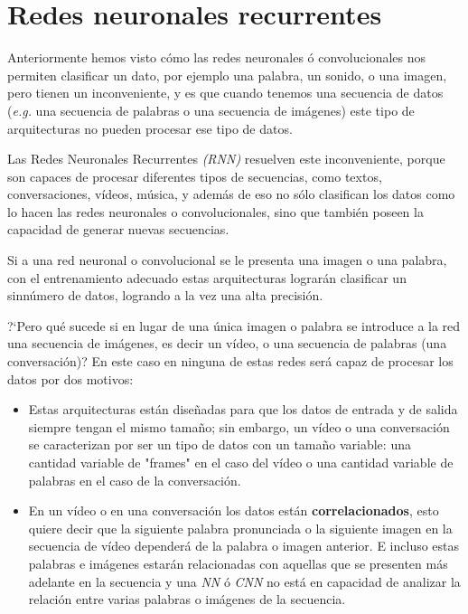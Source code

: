 \documentclass[a4paper,12pt]{article}
\begin{document}
\clearpage

\section{Redes neuronales recurrentes}
Anteriormente hemos visto cómo las redes neuronales ó convolucionales nos permiten clasificar un dato, por ejemplo una palabra, un sonido, o una imagen, pero tienen un inconveniente, y es que cuando tenemos una secuencia de datos (\textit{e.g.} una secuencia de palabras o una secuencia de imágenes) este tipo de arquitecturas no pueden procesar ese tipo de datos. 

Las Redes Neuronales Recurrentes \textit{(RNN)} \citep{karpathy:rnn} resuelven este inconveniente, porque son capaces de procesar diferentes tipos de secuencias, como textos, conversaciones, vídeos, música, y además de eso no sólo clasifican los datos como lo hacen las redes neuronales o convolucionales, sino que también poseen la capacidad de generar nuevas secuencias.

Si a una red neuronal o convolucional se le presenta una imagen o una palabra, con el entrenamiento adecuado estas arquitecturas lograrán clasificar un sinnúmero de datos, logrando a la vez una alta precisión. 

?`Pero qué sucede si en lugar de una única imagen o palabra se introduce a la red una secuencia de imágenes, es decir un vídeo, o una secuencia de palabras (una conversación)? En este caso en ninguna de estas redes será capaz de procesar los datos por dos motivos:
\begin{itemize}[noitemsep, topsep=2pt]
	\item Estas arquitecturas están diseñadas para que los datos de entrada y de salida siempre tengan el mismo tamaño; sin embargo, un vídeo o una conversación se caracterizan por ser un tipo de datos con un tamaño variable: una cantidad variable de "frames"
	      en el caso del vídeo o una cantidad variable de palabras en el caso de la conversación. 
	\item En un vídeo o en una conversación los datos están \textbf{correlacionados}, esto quiere decir que la siguiente palabra pronunciada o la siguiente imagen en la secuencia de vídeo dependerá de la palabra o imagen anterior. E incluso estas palabras e imágenes estarán relacionadas con aquellas que se presenten más adelante en la secuencia y una \textit{NN} ó \textit{CNN} no está en capacidad de analizar la relación entre varias palabras o imágenes de la secuencia.
\end{itemize}
\end{document}
